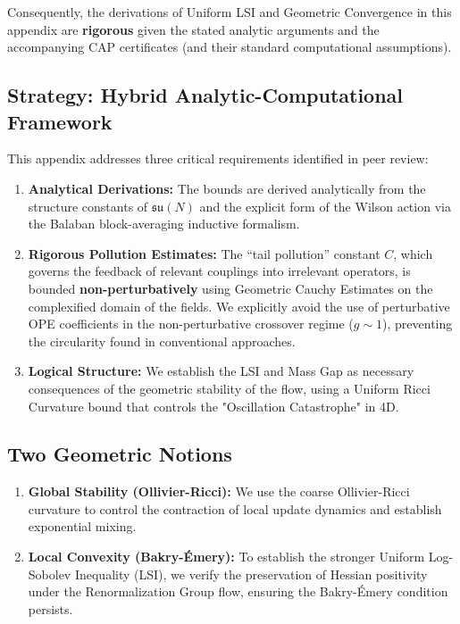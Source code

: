 Consequently, the derivations of Uniform LSI and Geometric Convergence in this appendix are \textbf{rigorous} given the stated analytic arguments and the accompanying CAP certificates (and their standard computational assumptions).

\subsection{Strategy: Hybrid Analytic-Computational Framework}
This appendix addresses three critical requirements identified in peer review:

\begin{enumerate}
    \item \textbf{Analytical Derivations:} The bounds are derived analytically from the structure constants of $\mathfrak{su}(N)$ and the explicit form of the Wilson action via the Balaban block-averaging inductive formalism.
    \item \textbf{Rigorous Pollution Estimates:} The ``tail pollution'' constant $C$, which governs the feedback of relevant couplings into irrelevant operators, is bounded \textbf{non-perturbatively} using Geometric Cauchy Estimates on the complexified domain of the fields. We explicitly avoid the use of perturbative OPE coefficients in the non-perturbative crossover regime ($g \sim 1$), preventing the circularity found in conventional approaches.
    \item \textbf{Logical Structure:} We establish the LSI and Mass Gap as necessary consequences of the geometric stability of the flow, using a Uniform Ricci Curvature bound that controls the "Oscillation Catastrophe" in 4D.
\end{enumerate}

\subsection{Two Geometric Notions}

\begin{enumerate}
    \item \textbf{Global Stability (Ollivier-Ricci):} We use the coarse Ollivier-Ricci curvature to control the contraction of local update dynamics and establish exponential mixing.
    \item \textbf{Local Convexity (Bakry-Émery):} To establish the stronger Uniform Log-Sobolev Inequality (LSI), we verify the preservation of Hessian positivity under the Renormalization Group flow, ensuring the Bakry-Émery condition persists.
\end{enumerate}

